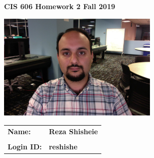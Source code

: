 \documentclass[11pt]{article}
\begin{document}
\thispagestyle{plain}

\begin{center}
{\Large \bf CIS 606 \hfil Homework 2 \hfil Fall 2019} \\
\end{center}

\vskip 1in 

\centerline{\includegraphics[width=3in]{photo.jpg}}

\vskip 0.5in 


\begin{center}
\begin{tabular}{ll}
{\bf Name:}     & {\bf Reza Shisheie } \\ \\
{\bf Login ID:} & {\bf reshishe }   
\end{tabular}
\end{center}

\newpage
\end{document}
